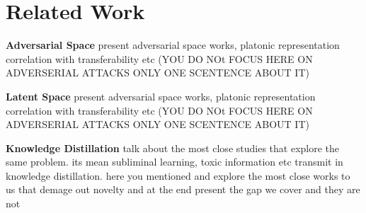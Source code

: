 \section{Related Work}

\textbf{Adversarial Space} 
present adversarial space works, platonic representation correlation with transferability etc (YOU DO NOt FOCUS HERE ON ADVERSERIAL ATTACKS ONLY ONE SCENTENCE ABOUT IT)

\textbf{Latent Space} 
present adversarial space works, platonic representation correlation with transferability etc (YOU DO NOt FOCUS HERE ON ADVERSERIAL ATTACKS ONLY ONE SCENTENCE ABOUT IT)

\textbf{Knowledge Distillation} 
talk about the most close studies that explore the same problem. its mean subliminal learning, toxic information etc transmit in knowledge distillation. here you mentioned and explore the most close works to us that demage out novelty and at the end present the gap we cover and they are not

